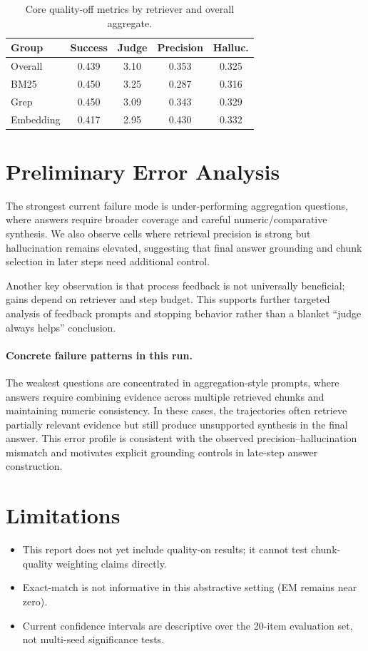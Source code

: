 \documentclass[11pt]{article}
\begin{document}
\begin{table}[t]
    \centering
    \small
    \begin{tabular}{lcccc}
        \toprule
        Group & Success & Judge & Precision & Halluc. \\
        \midrule
        Overall & 0.439 & 3.10 & 0.353 & 0.325 \\
        BM25 & 0.450 & 3.25 & 0.287 & 0.316 \\
        Grep & 0.450 & 3.09 & 0.343 & 0.329 \\
        Embedding & 0.417 & 2.95 & 0.430 & 0.332 \\
        \bottomrule
    \end{tabular}
    \caption{Core quality-off metrics by retriever and overall aggregate.}
    \label{tab:core_metrics}
\end{table}

\section{Preliminary Error Analysis}
The strongest current failure mode is under-performing aggregation questions, where answers require broader coverage and careful numeric/comparative synthesis. We also observe cells where retrieval precision is strong but hallucination remains elevated, suggesting that final answer grounding and chunk selection in later steps need additional control.

Another key observation is that process feedback is not universally beneficial; gains depend on retriever and step budget. This supports further targeted analysis of feedback prompts and stopping behavior rather than a blanket ``judge always helps'' conclusion.

\paragraph{Concrete failure patterns in this run.}
The weakest questions are concentrated in aggregation-style prompts, where answers require combining evidence across multiple retrieved chunks and maintaining numeric consistency. In these cases, the trajectories often retrieve partially relevant evidence but still produce unsupported synthesis in the final answer. This error profile is consistent with the observed precision--hallucination mismatch and motivates explicit grounding controls in late-step answer construction.

\section{Limitations}
\begin{itemize}[leftmargin=*, topsep=2pt, itemsep=1pt]
    \item This report does not yet include quality-on results; it cannot test chunk-quality weighting claims directly.
    \item Exact-match is not informative in this abstractive setting (EM remains near zero).
    \item Current confidence intervals are descriptive over the 20-item evaluation set, not multi-seed significance tests.
\end{itemize}
\end{document}
